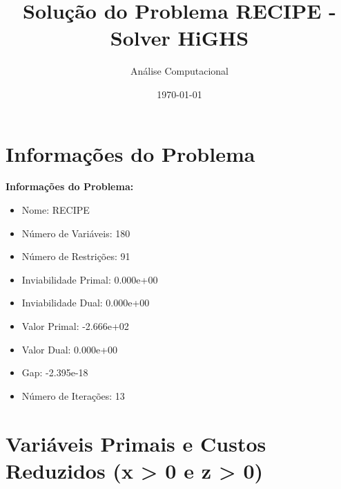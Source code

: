 \documentclass[12pt]{article}
\title{Solução do Problema RECIPE - Solver HiGHS}
\author{Análise Computacional}
\date{\today}
\begin{document}
\maketitle

\section{Informações do Problema}

\textbf{Informações do Problema:}
\begin{itemize}
\item Nome: RECIPE
\item Número de Variáveis: 180
\item Número de Restrições: 91
\item Inviabilidade Primal: 0.000e+00
\item Inviabilidade Dual: 0.000e+00
\item Valor Primal: -2.666e+02
\item Valor Dual: 0.000e+00
\item Gap: -2.395e-18
\item Número de Iterações: 13
\end{itemize}


\section{Variáveis Primais e Custos Reduzidos (x > 0 e z > 0)}
\end{document}
